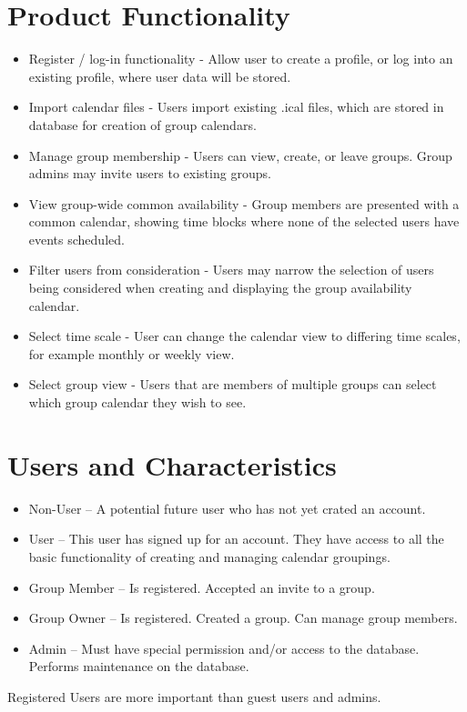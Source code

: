 \documentclass{scrreprt}
\begin{document}
\section{Product Functionality}
\begin{itemize}
\item Register / log-in functionality - Allow user to create a profile, or log
into an existing profile, where user data will be stored.
\item Import calendar files - Users import existing .ical files, which are
stored in database for creation of group calendars.
\item Manage group membership - Users can view, create, or leave groups. Group
admins may invite users to existing groups.
\item View group-wide common availability - Group members are presented with a
common calendar, showing time blocks where none of the selected users have
events scheduled.
\item Filter users from consideration - Users may narrow the selection of users
being considered when creating and displaying the group availability calendar.
\item Select time scale - User can change the calendar view to differing time 
scales, for example monthly or weekly view.
\item Select group view - Users that are members of multiple groups can select
which group calendar they wish to see.
\end{itemize}

\section{Users and Characteristics}
\begin{itemize}
	\item Non-User – A potential future user who has not yet crated an account.
    \item User – This user has signed up for an account. They have access to
all the basic functionality of creating and managing calendar groupings.
    \item Group Member – Is registered. Accepted an invite to a group.
    \item Group Owner – Is registered. Created a group. Can manage group members.
    \item Admin – Must have special permission and/or access to the database. Performs
maintenance on the database.
\end{itemize}
Registered Users are more important than guest users and admins.
\end{document}
